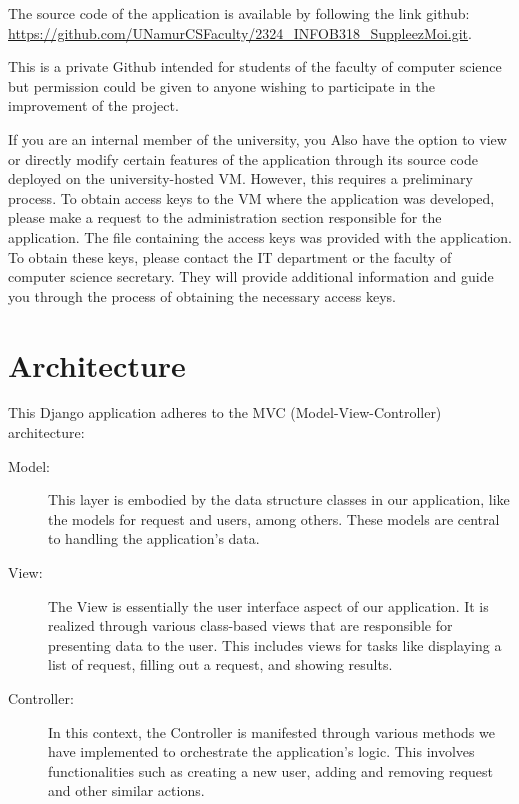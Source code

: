 \documentclass[12pt]{article}
\begin{document}
The source code of the application is available by following the link github: \url{https://github.com/UNamurCSFaculty/2324_INFOB318_SuppleezMoi.git}. 

This is a private
Github intended for students of the faculty of computer science but permission could be given
to anyone wishing to participate in the improvement of the project. 

If you are an internal member of the university, you Also have the option to view or directly modify certain features of the application through its source code deployed on the university-hosted VM. However, this requires a preliminary process. To obtain access keys to the VM where the application was developed, please make a request to the administration section responsible for the application. The file containing the access keys was provided with the application. To obtain these keys, please contact the IT department or the faculty of computer science secretary. They will provide additional information and guide you through the process of obtaining the necessary access keys.

\section{Architecture}


This Django application adheres to the MVC (Model-View-Controller) architecture:

\begin{description}
    \item[Model:] This layer is embodied by the data structure classes in our application, like the models for request and users, among others. These models are central to handling the application's data.

    \item[View:] The View is essentially the user interface aspect of our application. It is realized through various class-based views that are responsible for presenting data to the user. This includes views for tasks like displaying a list of request, filling out a request, and showing results.

    \item[Controller:] In this context, the Controller is manifested through various methods we have implemented to orchestrate the application's logic. This involves functionalities such as creating a new user, adding and removing request and other similar actions.
\end{description}
\end{document}
